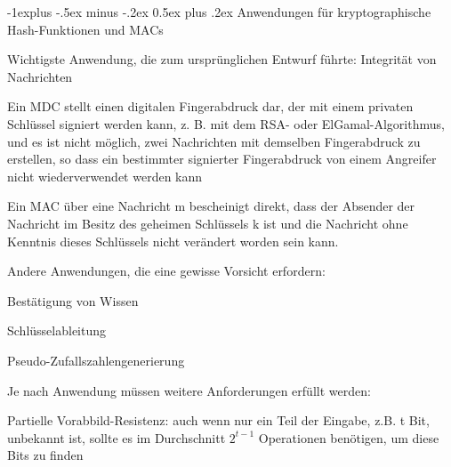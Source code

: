 \documentclass[a4paper]{article}
\makeatletter
\renewcommand{\subsection}{\@startsection{subsection}{2}{0mm}%
 {-1explus -.5ex minus -.2ex}%
 {0.5ex plus .2ex}%
 {\normalfont\normalsize\bfseries}}
\makeatother
\begin{document}
\begin{multicols}{3}
      \subsection{Anwendungen für kryptographische Hash-Funktionen und MACs}
      \begin{itemize*}
            \item Wichtigste Anwendung, die zum ursprünglichen Entwurf führte: Integrität von Nachrichten
            \begin{itemize*}
                  \item Ein MDC stellt einen digitalen Fingerabdruck dar, der mit einem privaten Schlüssel signiert werden kann, z. B. mit dem RSA- oder ElGamal-Algorithmus, und es ist nicht möglich, zwei Nachrichten mit demselben Fingerabdruck zu erstellen, so dass ein bestimmter signierter Fingerabdruck von einem Angreifer nicht wiederverwendet werden kann
                  \item Ein MAC über eine Nachricht m bescheinigt direkt, dass der Absender der Nachricht im Besitz des geheimen Schlüssels k ist und die Nachricht ohne Kenntnis dieses Schlüssels nicht verändert worden sein kann.
            \end{itemize*}
            \item Andere Anwendungen, die eine gewisse Vorsicht erfordern:
            \begin{itemize*}
                  \item Bestätigung von Wissen
                  \item Schlüsselableitung
                  \item Pseudo-Zufallszahlengenerierung
            \end{itemize*}
            \item Je nach Anwendung müssen weitere Anforderungen erfüllt werden:
            \begin{itemize*}
                  \item Partielle Vorabbild-Resistenz: auch wenn nur ein Teil der Eingabe, z.B. t Bit, unbekannt ist, sollte es im Durchschnitt $2^{t-1}$ Operationen benötigen, um diese Bits zu finden
            \end{itemize*}
      \end{itemize*}


\end{multicols}
\end{document}
